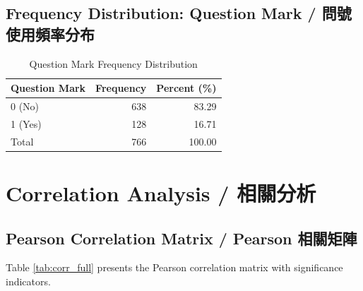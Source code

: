 \documentclass[12pt,a4paper,fontset=none]{ctexart}
\begin{document}
\subsection{Frequency Distribution: Question Mark / 問號使用頻率分布}

\begin{table}[H]
\centering
\caption{Question Mark Frequency Distribution}
\small
\begin{tabular}{lrr}
\toprule
Question Mark & Frequency & Percent (\%) \\
\midrule
0 (No) & 638 & 83.29 \\
1 (Yes) & 128 & 16.71 \\
\midrule
Total & 766 & 100.00 \\
\bottomrule
\end{tabular}
\end{table}

\newpage

\section{Correlation Analysis / 相關分析}

\subsection{Pearson Correlation Matrix / Pearson 相關矩陣}

Table \ref{tab:corr_full} presents the Pearson correlation matrix with significance indicators.
\end{document}
